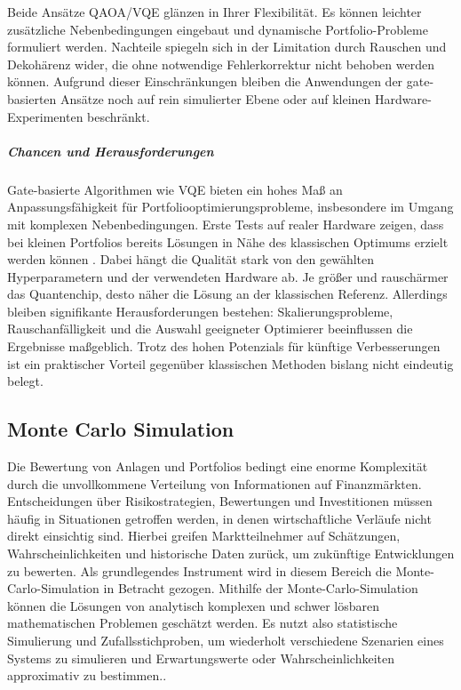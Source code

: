 Beide Ansätze QAOA/VQE glänzen in Ihrer Flexibilität. Es können leichter zusätzliche Nebenbedingungen eingebaut und dynamische Portfolio-Probleme formuliert werden. Nachteile spiegeln sich in der Limitation durch Rauschen und Dekohärenz wider, die ohne notwendige Fehlerkorrektur nicht behoben werden können. Aufgrund dieser Einschränkungen bleiben die Anwendungen der gate-basierten Ansätze noch auf rein simulierter Ebene oder auf kleinen Hardware-Experimenten beschränkt.

\subparagraph{Chancen und Herausforderungen}

Gate-basierte Algorithmen wie VQE bieten ein hohes Maß an Anpassungsfähigkeit für Portfoliooptimierungsprobleme, insbesondere im Umgang mit komplexen Nebenbedingungen. Erste Tests auf realer Hardware zeigen, dass bei kleinen Portfolios bereits Lösungen in Nähe des klassischen Optimums erzielt werden können \cite[S. 2–4]{buonaiuto_best_2023}. Dabei hängt die Qualität stark von den gewählten Hyperparametern und der verwendeten Hardware ab. Je größer und rauschärmer das Quantenchip, desto näher die Lösung an der klassischen Referenz. Allerdings bleiben signifikante Herausforderungen bestehen: Skalierungsprobleme, Rauschanfälligkeit und die Auswahl geeigneter Optimierer beeinflussen die Ergebnisse maßgeblich. Trotz des hohen Potenzials für künftige Verbesserungen ist ein praktischer Vorteil gegenüber klassischen Methoden bislang nicht eindeutig belegt.

\subsection{ Monte Carlo Simulation}

Die Bewertung von Anlagen und Portfolios bedingt eine enorme Komplexität durch die
unvollkommene Verteilung von Informationen auf Finanzmärkten. Entscheidungen über Risikostrategien, Bewertungen und Investitionen müssen häufig in Situationen getroffen werden, in denen wirtschaftliche Verläufe nicht direkt einsichtig sind. Hierbei greifen Marktteilnehmer auf Schätzungen, Wahrscheinlichkeiten und historische Daten zurück, um zukünftige Entwicklungen zu bewerten. 
 Als grundlegendes Instrument wird in diesem Bereich die Monte-Carlo-Simulation in Betracht gezogen. Mithilfe der Monte-Carlo-Simulation können die Lösungen von analytisch komplexen und schwer lösbaren mathematischen Problemen geschätzt werden. Es nutzt also statistische Simulierung und Zufallsstichproben, um wiederholt verschiedene Szenarien eines Systems zu simulieren und Erwartungswerte oder Wahrscheinlichkeiten approximativ zu bestimmen.\cite{orus_quantum_2019}.
 
